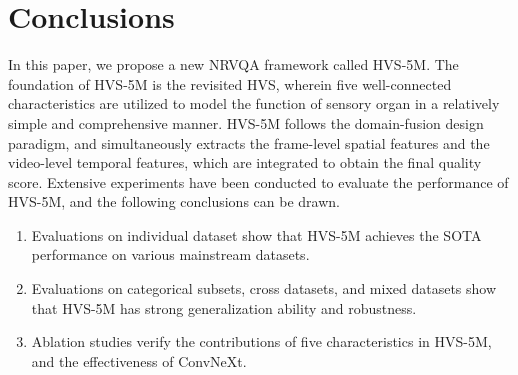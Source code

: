 \documentclass[journal]{IEEEtran}
\begin{document}
\section{Conclusions} \label{conclusion}
In this paper, we propose a new NRVQA framework called HVS-5M. The foundation of HVS-5M is the revisited HVS, wherein five well-connected characteristics are utilized to model the function of sensory organ in a relatively simple and comprehensive manner.
HVS-5M follows the domain-fusion design paradigm, and simultaneously extracts the frame-level spatial features and the video-level temporal features, which are integrated to obtain the final quality score.
Extensive experiments have been conducted to evaluate the performance of HVS-5M, and the following conclusions can be drawn.
\begin{enumerate}[]
\item Evaluations on individual dataset show that HVS-5M achieves the SOTA performance on various mainstream datasets.

\item Evaluations on categorical subsets, cross datasets, and mixed datasets show that HVS-5M has strong generalization ability and robustness.

\item Ablation studies verify the contributions of five characteristics in HVS-5M, and the effectiveness of ConvNeXt.
\end{enumerate}
\end{document}

